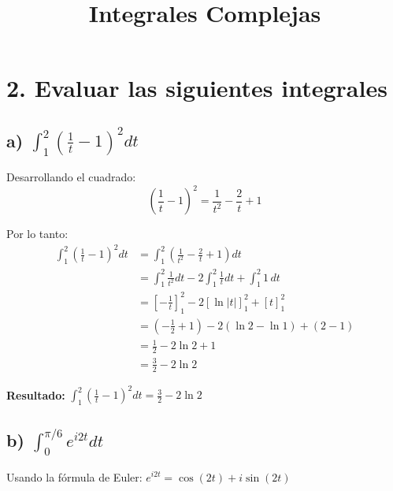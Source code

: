 \documentclass{article}
\title{Integrales Complejas}
\author{}
\date{}
\begin{document}
\maketitle

\section*{2. Evaluar las siguientes integrales}

\subsection*{a) $\int_1^2 \left(\frac{1}{t} - 1\right)^2 dt$}

Desarrollando el cuadrado:
$$\left(\frac{1}{t} - 1\right)^2 = \frac{1}{t^2} - \frac{2}{t} + 1$$

Por lo tanto:
\begin{align*}
\int_1^2 \left(\frac{1}{t} - 1\right)^2 dt &= \int_1^2 \left(\frac{1}{t^2} - \frac{2}{t} + 1\right) dt \\
                                            &= \int_1^2 \frac{1}{t^2} dt - 2\int_1^2 \frac{1}{t} dt + \int_1^2 1 \, dt \\
                                            &= \left[-\frac{1}{t}\right]_1^2 - 2\left[\ln|t|\right]_1^2 + \left[t\right]_1^2 \\
                                            &= \left(-\frac{1}{2} + 1\right) - 2(\ln 2 - \ln 1) + (2 - 1) \\
                                            &= \frac{1}{2} - 2\ln 2 + 1 \\
                                            &= \frac{3}{2} - 2\ln 2
\end{align*}

\textbf{Resultado:} $\int_1^2 \left(\frac{1}{t} - 1\right)^2 dt = \frac{3}{2} - 2\ln 2$

\subsection*{b) $\int_0^{\pi/6} e^{i2t} dt$}

Usando la fórmula de Euler: $e^{i2t} = \cos(2t) + i\sin(2t)$
\end{document}
